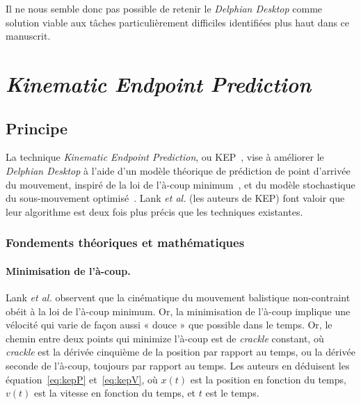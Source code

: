 	Il ne nous semble donc pas possible de retenir le \emph{Delphian Desktop} comme solution viable aux tâches particulièrement difficiles identifiées plus haut dans ce manuscrit.
	
\section{\emph{Kinematic Endpoint Prediction}}
	\subsection{Principe}
	La technique \emph{Kinematic Endpoint Prediction}, ou KEP~\cite{lank2007endpoint}, vise à améliorer le \emph{Delphian Desktop} à l'aide d'un modèle théorique de prédiction de point d'arrivée du mouvement, inspiré de la loi de l'à-coup minimum~\cite{hogan1984organizing, richardson2002comparing}\footnotemark{}, et du modèle stochastique du sous-mouvement optimisé~\cite{meyer1990speed}. Lank \emph{et al.} (les auteurs de KEP) font valoir que leur algorithme est deux fois plus précis que les techniques existantes.
	
	
	\subsubsection{Fondements théoriques et mathématiques}
	\paragraph{Minimisation de l'à-coup.}
	Lank \emph{et al.} observent que la cinématique du mouvement balistique non-contraint obéit à la loi de l'à-coup minimum. Or, la minimisation de l'à-coup implique une vélocité qui varie de façon aussi « douce » que possible dans le temps. Or, le chemin entre deux points qui minimize l'à-coup est de \emph{crackle} constant, où \emph{crackle} est la dérivée cinquième de la position par rapport au temps, ou la dérivée seconde de l'à-coup, toujours par rapport au temps. Les auteurs en déduisent les équation~\ref{eq:kepP} et~\ref{eq:kepV}, où $x(t)$ est la position en fonction du temps, $v(t)$ est la vitesse en fonction du temps, et $t$ est le temps.
	
